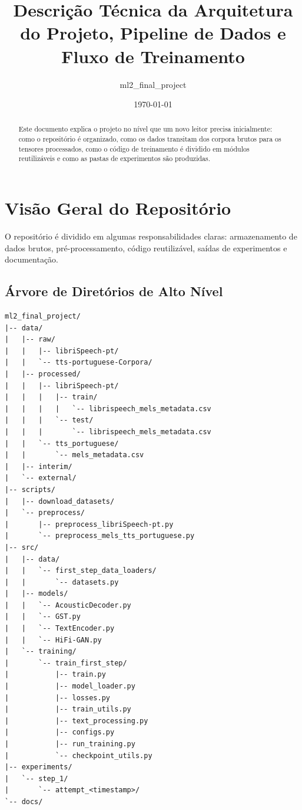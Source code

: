 \documentclass[11pt]{article}
\title{Descrição Técnica da Arquitetura do Projeto, Pipeline de Dados e Fluxo de Treinamento}
\author{ml2\_final\_project}
\date{\today}
\begin{document}
\maketitle

\begin{abstract}
Este documento explica o projeto no nível que um novo leitor precisa inicialmente: como o repositório é organizado, como os dados transitam dos corpora brutos para os tensores processados, como o código de treinamento é dividido em módulos reutilizáveis e como as pastas de experimentos são produzidas.
\end{abstract}

\tableofcontents
\newpage

\section{Visão Geral do Repositório}

O repositório é dividido em algumas responsabilidades claras: armazenamento de dados brutos, pré-processamento, código reutilizável, saídas de experimentos e documentação.

\subsection{Árvore de Diretórios de Alto Nível}

\begin{lstlisting}
ml2_final_project/
|-- data/
|   |-- raw/
|   |   |-- libriSpeech-pt/
|   |   `-- tts-portuguese-Corpora/
|   |-- processed/
|   |   |-- libriSpeech-pt/
|   |   |   |-- train/
|   |   |   |   `-- librispeech_mels_metadata.csv
|   |   |   `-- test/
|   |   |       `-- librispeech_mels_metadata.csv
|   |   `-- tts_portuguese/
|   |       `-- mels_metadata.csv
|   |-- interim/
|   `-- external/
|-- scripts/
|   |-- download_datasets/
|   `-- preprocess/
|       |-- preprocess_libriSpeech-pt.py
|       `-- preprocess_mels_tts_portuguese.py
|-- src/
|   |-- data/
|   |   `-- first_step_data_loaders/
|   |       `-- datasets.py
|   |-- models/
|   |   `-- AcousticDecoder.py
|   |   `-- GST.py
|   |   `-- TextEncoder.py
|   |   `-- HiFi-GAN.py
|   `-- training/
|       `-- train_first_step/
|           |-- train.py
|           |-- model_loader.py
|           |-- losses.py
|           |-- train_utils.py
|           |-- text_processing.py
|           |-- configs.py
|           |-- run_training.py
|           `-- checkpoint_utils.py
|-- experiments/
|   `-- step_1/
|       `-- attempt_<timestamp>/
`-- docs/
\end{lstlisting}
\end{document}
